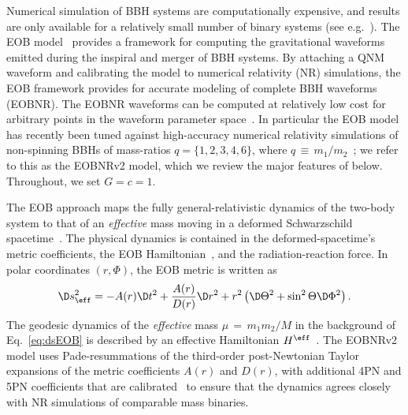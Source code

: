 Numerical simulation of BBH systems are computationally expensive, and results
are only available for a relatively small number of binary systems (see
e.g.~\citep{Ajith:2012tt}).  The EOB model~\citep{EOBOriginalBuonannoDamour}
provides a framework for computing the gravitational waveforms emitted during
the inspiral and merger of BBH systems.  By attaching a QNM waveform and
calibrating the model to numerical relativity (NR) simulations, the EOB
framework provides for accurate modeling of complete BBH waveforms (EOBNR). The
EOBNR waveforms can be computed at relatively low cost for arbitrary points in the
waveform parameter
space~\citep{EOBNR01,EOBNRdevel01,EOBNRdevel02,EOBNRdevel03,EOBNRdevel04,EOBdevel01,EOBdevel02,BuonannoEOBv2Main}.
In particular the EOB model has recently been tuned against high-accuracy
numerical relativity simulations of non-spinning BBHs of mass-ratios
$q=\{1,2,3,4,6\}$, where $q\,\equiv \, m_1/m_2$~\citep{BuonannoEOBv2Main}; we
refer to this as the EOBNRv2 model, which we review the major features of
below. Throughout, we set $G=c=1$.

The EOB approach maps the fully general-relativistic dynamics of the two-body
system to that of an \textit{effective} mass moving in a deformed
Schwarzschild spacetime~\citep{EOBOriginalBuonannoDamour}. The physical
dynamics is contained in the deformed-spacetime's metric coefficients, the EOB
Hamiltonian~\citep{EOBOriginalBuonannoDamour}, and the radiation-reaction
force. In polar coordinates $(r,\Phi)$, the EOB metric is written as
\begin{equation}\label{eq:dsEOB}
\D s_{\eff}^2 = -A(r)\D t^2 + \dfrac{A(r)}{D(r)}\D r^2 + r^2\left(\D\Theta^2 + \sin^2\Theta \D\Phi^2\right).
\end{equation}
The geodesic dynamics of the \textit{effective} mass $\mu\,=\,m_1 m_2 /
M$ in the background of Eq.~\eqref{eq:dsEOB} is described by an effective
Hamiltonian $H^{\eff}$~\citep{EOBOriginalBuonannoDamour,PadeAD}.
The EOBNRv2 model uses Pade-resummations of the third-order post-Newtonian
Taylor expansions of the metric coefficients $A(r)$ and $D(r)$, with
additional 4PN and 5PN coefficients that are
calibrated~\citep{EOBNRdevel01,EOBNRdevel02,EOBNRdevel03,EOBNRdevel04,BuonannoEOBv2Main} 
to ensure that the dynamics agrees closely with NR simulations of comparable
mass binaries.

